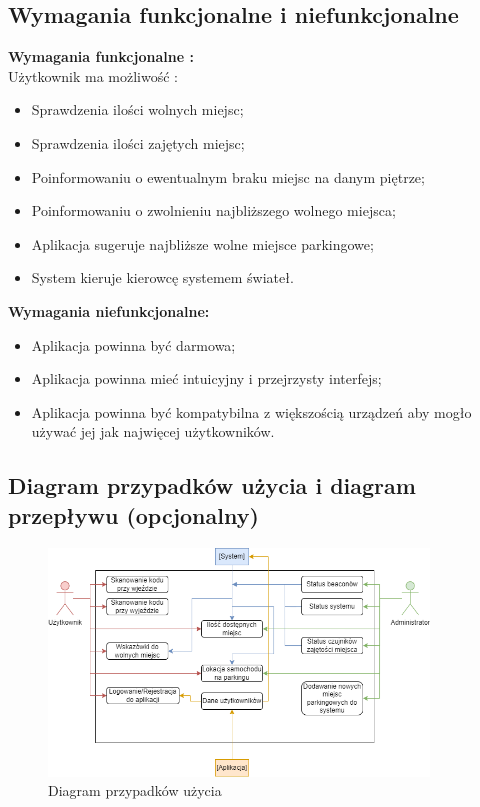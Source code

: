 \documentclass[12pt,a4paper]{article}
\begin{document}
\subsection{Wymagania funkcjonalne i niefunkcjonalne}
{\large \bf Wymagania funkcjonalne :}
\\Użytkownik ma możliwość :
\begin{itemize}
\item Sprawdzenia ilości wolnych miejsc;
\item Sprawdzenia ilości zajętych miejsc;
\item Poinformowaniu o ewentualnym braku miejsc na danym piętrze;
\item Poinformowaniu o zwolnieniu najbliższego wolnego miejsca;
\item Aplikacja sugeruje najbliższe wolne miejsce parkingowe;
\item System kieruje kierowcę systemem świateł.
\end{itemize}
{\large \bf Wymagania niefunkcjonalne:}
\begin{itemize}
\item Aplikacja powinna być darmowa;
\item Aplikacja powinna mieć intuicyjny i przejrzysty interfejs;
\item Aplikacja powinna być kompatybilna z większością urządzeń aby mogło używać jej jak najwięcej użytkowników.
\end{itemize}



\newpage

\subsection{Diagram przypadków użycia i diagram przepływu (opcjonalny)}
\begin{figure}[htb!p]
\begin{center}
\includegraphics[width=0.9\textwidth]{Untitled_Diagram.drawio_1.png}
\caption{Diagram przypadków użycia}
\end{center}
\end{figure}
\end{document}
